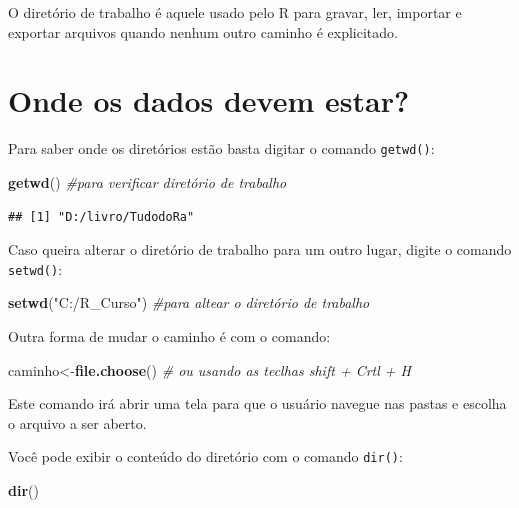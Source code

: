 \documentclass[
]{book}
\newenvironment{Shaded}{\begin{snugshade}}{\end{snugshade}}
\newcommand{\CommentTok}[1]{\textcolor[rgb]{0.56,0.35,0.01}{\textit{#1}}}
\newcommand{\KeywordTok}[1]{\textcolor[rgb]{0.13,0.29,0.53}{\textbf{#1}}}
\newcommand{\NormalTok}[1]{#1}
\newcommand{\StringTok}[1]{\textcolor[rgb]{0.31,0.60,0.02}{#1}}
\begin{document}
O diretório de trabalho é aquele usado pelo R para gravar, ler, importar e exportar arquivos quando nenhum outro caminho é explicitado.

\hypertarget{onde-os-dados-devem-estar}{%
\section{Onde os dados devem estar?}\label{onde-os-dados-devem-estar}}

Para saber onde os diretórios estão basta digitar o comando \texttt{getwd()}:

\begin{Shaded}
\begin{Highlighting}[]
 \KeywordTok{getwd}\NormalTok{() }\CommentTok{#para verificar  diretório de trabalho}
\end{Highlighting}
\end{Shaded}

\begin{verbatim}
## [1] "D:/livro/TudodoRa"
\end{verbatim}

Caso queira alterar o diretório de trabalho para um outro lugar, digite o comando \texttt{setwd()}:

\begin{Shaded}
\begin{Highlighting}[]
\KeywordTok{setwd}\NormalTok{(}\StringTok{"C:/R_Curso"}\NormalTok{) }\CommentTok{#para  altear o diretório de trabalho}
\end{Highlighting}
\end{Shaded}

Outra forma de mudar o caminho é com o comando:

\begin{Shaded}
\begin{Highlighting}[]
\NormalTok{caminho<-}\KeywordTok{file.choose}\NormalTok{() }\CommentTok{# ou usando as teclhas shift + Crtl + H}
\end{Highlighting}
\end{Shaded}

Este comando irá abrir uma tela para que o usuário navegue nas pastas e escolha o arquivo a ser aberto.

Você pode exibir o conteúdo do diretório com o comando \texttt{dir()}:

\begin{Shaded}
\begin{Highlighting}[]
\KeywordTok{dir}\NormalTok{()}
\end{Highlighting}
\end{Shaded}
\end{document}
